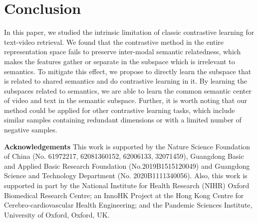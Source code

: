 \documentclass{article}
\newcommand{\myparagraph}[1]{\textbf{#1}\hspace{1.8ex}}
\begin{document}
\section{Conclusion}
\vspace{-5pt}
In this paper, we studied the intrinsic limitation of classic contrastive learning for text-video retrieval.  We found that the contrastive method in the entire representation space fails to preserve inter-modal semantic relatedness, which makes the features gather or separate in the subspace which is irrelevant to semantics. To mitigate this effect, we propose to directly learn the subspace that is related to shared semantics and do contrastive learning in it. By learning the subspaces related to semantics, we are able to learn the common semantic center of video and text in the semantic subspace. Further, it is worth noting that our method could be applied for other contrastive learning tasks, which include similar samples containing redundant dimensions or with a limited number of negative samples.

\myparagraph{Acknowledgements} This work is supported by the Nature Science Foundation of China (No. 61972217, 62081360152, 62006133, 32071459), Guangdong Basic and Applied Basic Research Foundation (No.2019B1515120049) and Guangdong Science and Technology Department (No. 2020B1111340056).
Also, this work is supported in part by the National Institute for Health Research (NIHR) Oxford Biomedical Research Centre; an InnoHK Project at the Hong Kong Centre for Cerebro-cardiovascular Health Engineering; and the Pandemic Sciences Institute, University of Oxford, Oxford, UK.



\end{document}
